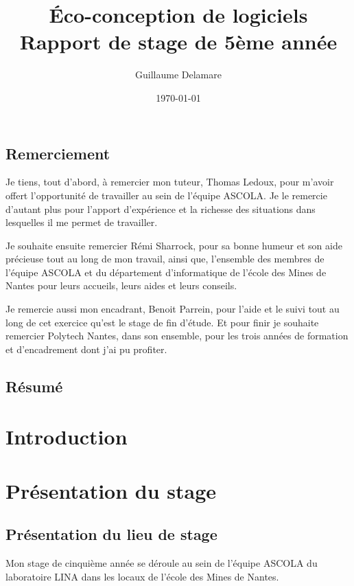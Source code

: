 \documentclass[a4paper, 11pt]{report}
\title{Éco-conception de logiciels\\ \large Rapport de stage de 5ème année}
\author{Guillaume Delamare}
\date{\today}
\begin{document}
\renewcommand{\labelitemi}{$\bullet$}
\renewcommand{\labelitemii}{$\diamond$}
\renewcommand{\labelitemiii}{$\ast$}
\renewcommand{\labelitemiv}{$\cdot$}

\maketitle

\section*{Remerciement}
Je tiens, tout d'abord, à remercier mon tuteur, Thomas Ledoux, pour m'avoir offert l'opportunité de travailler au sein de l'équipe ASCOLA. Je le remercie d'autant plus pour l'apport d'expérience et la richesse des situations dans lesquelles il me permet de travailler.

Je souhaite ensuite remercier Rémi Sharrock, pour sa bonne humeur et son aide précieuse tout au long de mon travail, ainsi que, l'ensemble des membres de l'équipe ASCOLA et du département d'informatique de l'école des Mines de Nantes pour leurs accueils, leurs aides et leurs conseils.

Je remercie aussi mon encadrant, Benoit Parrein, pour l'aide et le suivi tout au long de cet exercice qu'est le stage de fin d'étude. Et pour finir je souhaite remercier Polytech Nantes, dans son ensemble, pour les trois années de formation et d'encadrement dont j'ai pu profiter.

\newpage

\section*{Résumé}

\newpage

\tableofcontents

\chapter{Introduction}

\chapter{Présentation du stage}
	\section{Présentation du lieu de stage}
Mon stage de cinquième année se déroule au sein de l’équipe ASCOLA du laboratoire LINA dans les locaux de l’école des Mines de Nantes.
\end{document}
